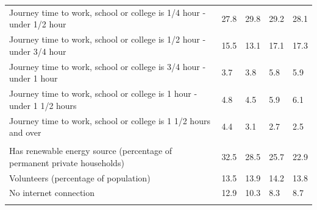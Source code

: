 \documentclass{article}
\begin{document}
\begin{table}[h]
\begin{tabular}{KTTTT}
Journey time to work, school or college is 1/4 hour - under 1/2 hour & 27.8& 29.8& 29.2& 28.1\\
Journey time to work, school or college is 1/2 hour - under 3/4 hour & 15.5& 13.1& 17.1& 17.3\\
Journey time to work, school or college is 3/4 hour - under 1 hour & 3.7& 3.8& 5.8& 5.9\\
Journey time to work, school or college is 1 hour - under 1 1/2 hours & 4.8& 4.5& 5.9& 6.1\\
Journey time to work, school or college is 1 1/2 hours and over & 4.4& 3.1& 2.7& 2.5\\
\hline
    \\ 
    \hline
Has renewable energy source (percentage of permanent private households) & 32.5& 28.5& 25.7& 22.9\\
    \hline
Volunteers (percentage of population) & 13.5& 13.9& 14.2& 13.8\\
    \hline
No internet connection& 12.9& 10.3&  8.3&  8.7\\
\hline
\end{tabular}
\end{table}
\end{document}
